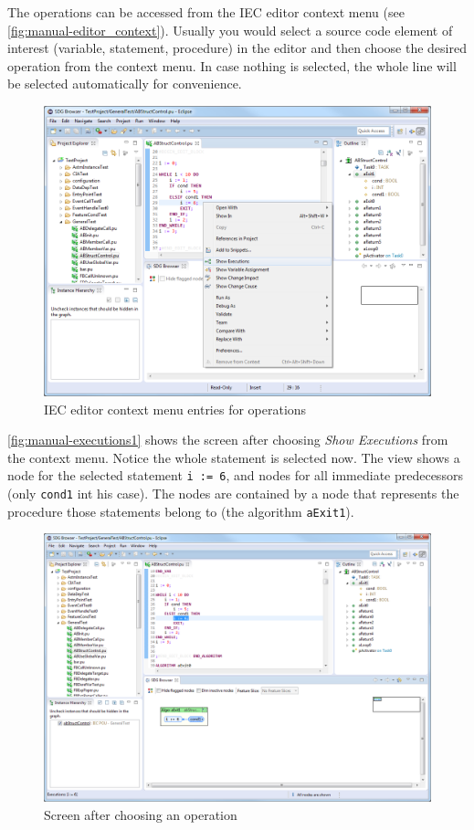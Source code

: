 \clearpage
The \SB operations can be accessed from the IEC editor context menu (see \autoref{fig:manual-editor_context}). Usually 
you would select a source code element of interest (variable, statement, procedure) in the editor and then choose the 
desired operation from the context menu. In case nothing is selected, the whole line will be selected automatically for 
convenience.

\begin{figure}[hp]
  \centering
    \includegraphics[width=\textwidth]{bilder/manual-editor_context}
  \caption{IEC editor context menu entries for \SB operations}
  \label{fig:manual-editor_context}
\end{figure}

\autoref{fig:manual-executions1} shows the screen after choosing \emph{Show Executions} from the context menu. Notice 
the whole statement is selected now. The \SB view shows a node for the selected statement \lstinline|i := 6|, and nodes 
for all immediate predecessors (only \lstinline|cond1| int his case). The nodes are contained by a node that represents 
the procedure those statements belong to (the algorithm \lstinline|aExit1|).

\begin{figure}[htp]
  \centering
    \includegraphics[width=\textwidth]{bilder/manual-executions1}
  \caption{Screen after choosing an \SB operation}
  \label{fig:manual-executions1}
\end{figure}

